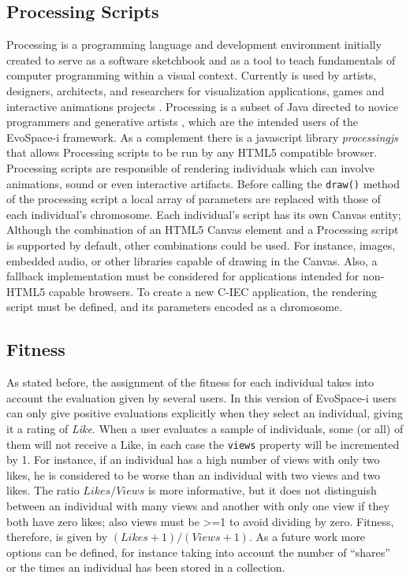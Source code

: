\documentclass{sig-alternate}
\begin{document}
\subsection{Processing Scripts}
Processing is a programming language and development environment initially created to serve as a software sketchbook and as a tool to teach fundamentals
of computer programming within a visual context.
Currently is used by artists, designers, architects, and researchers for visualization applications, games and interactive animations projects \cite{Reas:2007wp}.
Processing is a subset of Java directed to novice programmers and generative artists \cite{Pearson:2011ti}, which are the intended users of the EvoSpace-i framework.
As a complement there is a javascript library \emph{processingjs} that allows Processing scripts to be run by any HTML5 compatible browser.
Processing scripts are responsible of rendering individuals which can involve animations, sound or even interactive artifacts.
Before calling the \texttt{draw()} method of the processing script a local array of parameters are replaced with those of each individual's chromosome.
Each individual's script has its own Canvas entity;
Although the combination of an HTML5 Canvas element and a Processing script is supported by default, other combinations could be used.
For instance, images, embedded audio, or other libraries capable of drawing in the Canvas.
Also, a fallback implementation must be considered for applications intended for non-HTML5 capable browsers.
To create a new C-IEC application, the  rendering script must be defined, and its parameters encoded as a chromosome.


\subsection{Fitness}
As stated before, the assignment of the fitness for each individual takes into account the evaluation given by several users. In this version of EvoSpace-i users can only give positive evaluations explicitly when they select an individual, giving it a rating of \emph{Like}.
When a user evaluates a sample of individuals, some (or all) of them will not receive a Like, in each case the \texttt{views} property will be incremented by 1. For instance, if an individual has a high number of views with only two likes, he is considered to be worse than an individual with two views and two likes. The ratio $Likes/Views$ is more informative, but it does not distinguish between an individual with many views and another with only
one view if they both have zero likes; also views must be >=1 to avoid dividing by zero. Fitness, therefore, is given by $(Likes+1)/(Views+1)$.
As a future work more options can be defined, for instance taking into account the number of ``shares'' or the times an individual has been stored in a collection.
\end{document}
